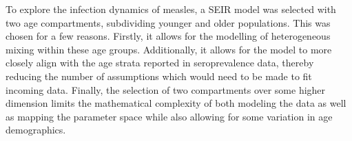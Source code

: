 \documentclass[../Paper.tex]{subfiles}
\begin{document}
  To explore the infection dynamics of measles, a SEIR model was selected with two
  age compartments, subdividing younger and older populations. This was chosen
  for a few reasons. Firstly, it allows for the modelling of heterogeneous mixing
  within these age groups. Additionally, it allows for the model to more closely
  align with the age strata reported in seroprevalence data, thereby reducing the
  number of assumptions which would need to be made to fit incoming data.
  Finally, the selection of two compartments over some higher dimension limits
  the mathematical complexity of both modeling the data as well as mapping the
  parameter space while also allowing for some variation in age demographics.

  \clearpage
\end{document}
